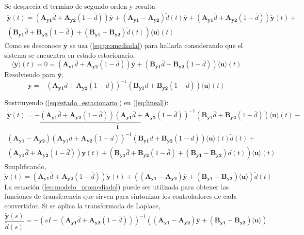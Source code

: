 Se desprecia el termino de segundo orden y resulta
\begin{eqnarray}
  \mathbf{\dot{\tilde{y}}}(t)=(\mathbf{A_{y1}}\bar{d}+\mathbf{A_{y2}}(1-\bar{d}))\mathbf{\bar{y}}+
  (\mathbf{A_{y1}}-\mathbf{A_{y2}})\tilde{d}(t)\mathbf{\bar{y}}+(\mathbf{A_{y1}}\bar{d}+ \mathbf{A_{y2}}(1-\bar{d}))\mathbf{\tilde{y}}(t)+ \nonumber \\
  (\mathbf{B_{y1}}\bar{d}+\mathbf{B_{y2}}(1-\bar{d})+(\mathbf{B_{y1}}-\mathbf{B_{y2}})\tilde{d}(t))\langle\mathbf{u}\rangle(t)
  \label{eq:lineal}
\end{eqnarray}
Como se desconoce $\mathbf{\bar{y}}$ se usa (\ref{eq:promediada}) para hallarla considerando que el sistema se encuentra en estado estacionario,
\[
\langle\mathbf{\dot{y}}\rangle(t)=0=(\mathbf{A_{y1}}\bar{d}+\mathbf{A_{y2}}(1-\bar{d}))\mathbf{\bar{y}}+(\mathbf{B_{y1}}\bar{d}+\mathbf{B_{y2}}(1-\bar{d}))\langle\mathbf{u}\rangle(t)
\]
Resolviendo para $\mathbf{\bar{y}}$,
\begin{equation}
\mathbf{\bar{y}}=-(\mathbf{A_{y1}}\bar{d}+\mathbf{A_{y2}}(1-\bar{d}))^{-1}(\mathbf{B_{y1}}\bar{d}+\mathbf{B_{y2}}(1-\bar{d}))\langle\mathbf{u}\rangle(t)
\label{eq:estado_estacionario}
\end{equation}

Sustituyendo (\ref{eq:estado_estacionario}) en (\ref{eq:lineal}):
\begin{eqnarray}
\mathbf{\dot{\tilde{y}}}(t)=-\underset{\mathbf{I}}{\underbrace{(\mathbf{A_{y1}}\bar{d}+\mathbf{A_{y2}}(1-\bar{d}))(\mathbf{A_{y1}}\bar{d}+\mathbf{A_{y2}}(1-\bar{d}))^{-1}}}(\mathbf{B_{y1}}\bar{d}+\mathbf{B_{y2}}(1-\bar{d}))\langle\mathbf{u}\rangle(t)- \nonumber \\
(\mathbf{A_{y1}}-\mathbf{A_{y2}})(\mathbf{A_{y1}}\bar{d}+\mathbf{A_{y2}}(1-\bar{d}))^{-1}(\mathbf{B_{y1}}\bar{d}+\mathbf{B_{y2}}(1-\bar{d}))\langle\mathbf{u}\rangle(t)\tilde{d}(t)+ \nonumber \\
(\mathbf{A_{y1}}\bar{d}+\mathbf{A_{y2}}(1-\bar{d}))\mathbf{\tilde{y}}(t)+(\mathbf{B_{y1}}\bar{d}+\mathbf{B_{y2}}(1-\bar{d})+(\mathbf{B_{y1}}-\mathbf{B_{y2}})\tilde{d}(t))\langle\mathbf{u}\rangle(t) \nonumber
\end{eqnarray}
Simplificando,
\begin{equation}
 \mathbf{\dot{\tilde{y}}}(t)=(\mathbf{A_{y1}}\bar{d}+\mathbf{A_{y2}}(1-\bar{d}))\mathbf{\tilde{y}}(t)+
((\mathbf{A_{y1}}-\mathbf{A_{y2}})\mathbf{\bar{y}}+(\mathbf{B_{y1}}-\mathbf{B_{y2}})\langle\mathbf{u}\rangle)\tilde{d}(t)
\label{eq:modelo_promediado}
\end{equation}
La ecuación (\ref{eq:modelo_promediado}) puede ser utilizada para obtener las funciones de transferencia que sirven para sintonizar los
controladores de cada convertidor. Si se aplica la transformada de Laplace,
\begin{equation}
 \frac{\mathbf{\dot{\tilde{y}}}(s)}{\tilde{d}(s)}=-(sI-(\mathbf{A_{y1}}\bar{d}+\mathbf{A_{y2}}(1-\bar{d})))^{-1}
((\mathbf{A_{y1}}-\mathbf{A_{y2}})\mathbf{\bar{y}}+(\mathbf{B_{y1}}-\mathbf{B_{y2}})\langle\mathbf{u}\rangle)
\label{eq:modelo_promediado_laplace}
\end{equation}

